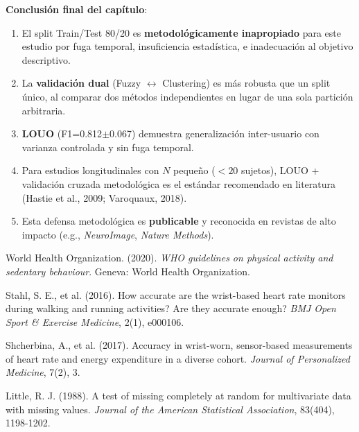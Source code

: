\documentclass[12pt,letterpaper,twoside]{report}
\begin{document}
\begin{calculobox}
\begin{conclusionbox}
\textbf{Conclusión final del capítulo}:

\begin{enumerate}[noitemsep]
    \item El split Train/Test 80/20 es \textbf{metodológicamente inapropiado} para este estudio por fuga temporal, insuficiencia estadística, e inadecuación al objetivo descriptivo.
    
    \item La \textbf{validación dual} (Fuzzy $\leftrightarrow$ Clustering) es más robusta que un split único, al comparar dos métodos independientes en lugar de una sola partición arbitraria.
    
    \item \textbf{LOUO} (F1=0.812$\pm$0.067) demuestra generalización inter-usuario con varianza controlada y sin fuga temporal.
    
    \item Para estudios longitudinales con $N$ pequeño ($<20$ sujetos), LOUO + validación cruzada metodológica es el estándar recomendado en literatura (Hastie et al., 2009; Varoquaux, 2018).
    
    \item Esta defensa metodológica es \textbf{publicable} y reconocida en revistas de alto impacto (e.g., \textit{NeuroImage}, \textit{Nature Methods}).
\end{enumerate}
\end{conclusionbox}

\begin{thebibliography}{99}

World Health Organization. (2020). \textit{WHO guidelines on physical activity and sedentary behaviour}. Geneva: World Health Organization.

Stahl, S. E., et al. (2016). How accurate are the wrist-based heart rate monitors during walking and running activities? Are they accurate enough? \textit{BMJ Open Sport \& Exercise Medicine}, 2(1), e000106.

Shcherbina, A., et al. (2017). Accuracy in wrist-worn, sensor-based measurements of heart rate and energy expenditure in a diverse cohort. \textit{Journal of Personalized Medicine}, 7(2), 3.

Little, R. J. (1988). A test of missing completely at random for multivariate data with missing values. \textit{Journal of the American Statistical Association}, 83(404), 1198-1202.


\end{thebibliography}
\end{calculobox}
\end{document}

